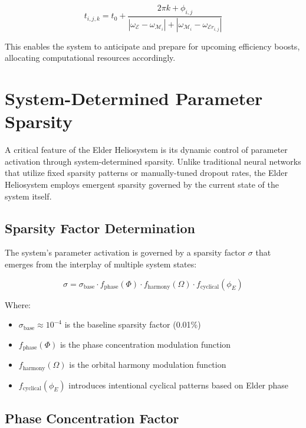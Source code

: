 \begin{equation}
t_{i,j,k} = t_0 + \frac{2\pi k + \phi_{i,j}}{|\omega_{\mathcal{E}} - \omega_{\mathcal{M}_i}| + |\omega_{\mathcal{M}_i} - \omega_{\mathcal{E}r_{i,j}}|}
\end{equation}

This enables the system to anticipate and prepare for upcoming efficiency boosts, allocating computational resources accordingly.

\section{System-Determined Parameter Sparsity}

A critical feature of the Elder Heliosystem is its dynamic control of parameter activation through system-determined sparsity. Unlike traditional neural networks that utilize fixed sparsity patterns or manually-tuned dropout rates, the Elder Heliosystem employs emergent sparsity governed by the current state of the system itself.

\subsection{Sparsity Factor Determination}

The system's parameter activation is governed by a sparsity factor $\sigma$ that emerges from the interplay of multiple system states:

\begin{equation}
\sigma = \sigma_{\text{base}} \cdot f_{\text{phase}}(\Phi) \cdot f_{\text{harmony}}(\Omega) \cdot f_{\text{cyclical}}(\phi_E)
\end{equation}

Where:
\begin{itemize}
    \item $\sigma_{\text{base}} \approx 10^{-4}$ is the baseline sparsity factor (0.01\%)
    \item $f_{\text{phase}}(\Phi)$ is the phase concentration modulation function
    \item $f_{\text{harmony}}(\Omega)$ is the orbital harmony modulation function
    \item $f_{\text{cyclical}}(\phi_E)$ introduces intentional cyclical patterns based on Elder phase
\end{itemize}

\subsection{Phase Concentration Factor}

